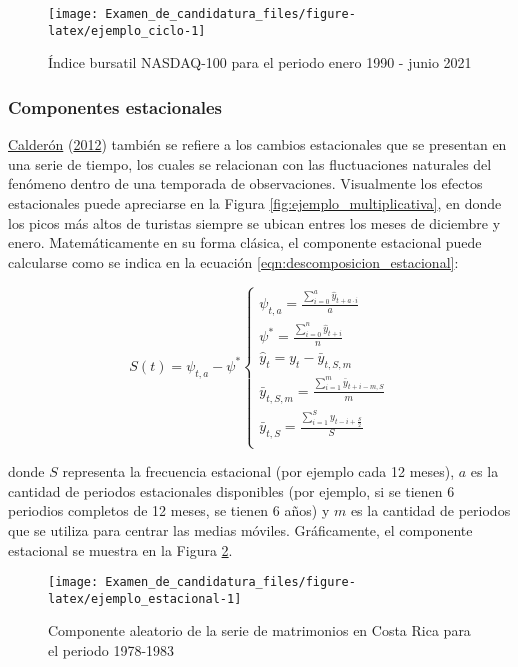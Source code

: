 \documentclass[
]{article}
\begin{document}
\begin{figure}[H]
\texttt{[image: Examen\_de\_candidatura\_files/figure-latex/ejemplo\_ciclo-1]} \caption{Índice bursatil NASDAQ-100 para el periodo enero 1990 - junio 2021}\label{fig:ejemplo_ciclo}
\end{figure}

\subsubsection{Componentes estacionales}

\protect\hyperlink{ref-calderon2012estadistica}{Calderón}
(\protect\hyperlink{ref-calderon2012estadistica}{2012}) también se
refiere a los cambios estacionales que se presentan en una serie de
tiempo, los cuales se relacionan con las fluctuaciones naturales del
fenómeno dentro de una temporada de observaciones. Visualmente los
efectos estacionales puede apreciarse en la Figura
\ref{fig:ejemplo_multiplicativa}, en donde los picos más altos de
turistas siempre se ubican entres los meses de diciembre y enero.
Matemáticamente en su forma clásica, el componente estacional puede
calcularse como se indica en la ecuación
\ref{eqn:descomposicion_estacional}:

\begin{equation}
\label{eqn:descomposicion_estacional}
S(t)=\psi_{t,a}-\psi^*
\begin{cases}
\psi_{t,a} = \frac{\sum_{i=0}^a \hat{y}_{t+a\cdot i}}{a} \\
\psi^*=\frac{\sum_{i=0}^n \hat{y}_{t+i}}{n} \\
\hat{y}_t=y_t-\bar{y}_{t,S,m} \\
\bar{y}_{t,S,m}=\frac{\sum_{i=1}^m \bar{y}_{t+i-m,S}}{m} \\
\bar{y}_{t,S}=\frac{\sum_{i=1}^S y_{t-i+\frac{S}{2}}}{S} \\
\end{cases}
\end{equation}

donde \(S\) representa la frecuencia estacional (por ejemplo cada 12
meses), \(a\) es la cantidad de periodos estacionales disponibles (por
ejemplo, si se tienen 6 periodios completos de 12 meses, se tienen 6
años) y \(m\) es la cantidad de periodos que se utiliza para centrar las
medias móviles. Gráficamente, el componente estacional se muestra en la
Figura \ref{fig:ejemplo_estacional}.

\begin{figure}[H]
\texttt{[image: Examen\_de\_candidatura\_files/figure-latex/ejemplo\_estacional-1]} \caption{Componente aleatorio de la serie de matrimonios en Costa Rica para el periodo 1978-1983}\label{fig:ejemplo_estacional}
\end{figure}
\end{document}
